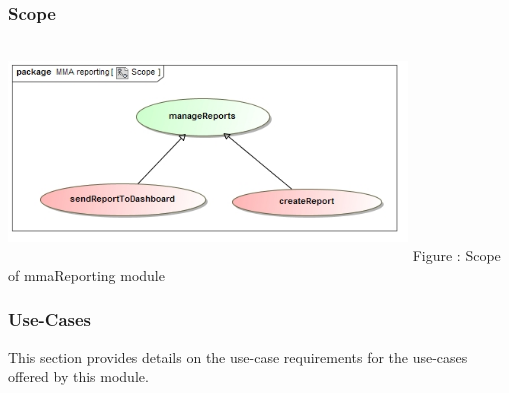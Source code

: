 \documentclass[hidelinks, 12pt, oneside]{article}
\begin{document}
	\subsubsection{Scope}
	\includegraphics[width=400px,height=220px]{img/scopeReports.jpg}
			Figure : Scope of mmaReporting module
	\subsubsection{Use-Cases}
			This section provides details on the use-case requirements for the use-cases offered by this module.
\end{document}
